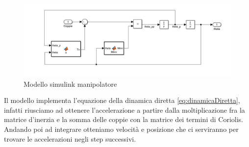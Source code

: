 \begin{figure}[ht]
	\begin{center}
		\includegraphics[scale=0.55]{Immagini/Dinamica/ModSimulink}
		\caption{Modello simulink manipolatore}
	\end{center}
\end{figure}
Il modello implementa l'equazione della dinamica diretta \ref{eq:dinamicaDiretta}, infatti riusciamo ad ottenere l'accelerazione a partire dalla moltiplicazione fra la matrice d'inerzia e la somma delle coppie con la matrice dei termini di Coriolis. Andando poi ad integrare otteniamo velocità e posizione che ci serviranno per trovare le accelerazioni negli step successivi.
